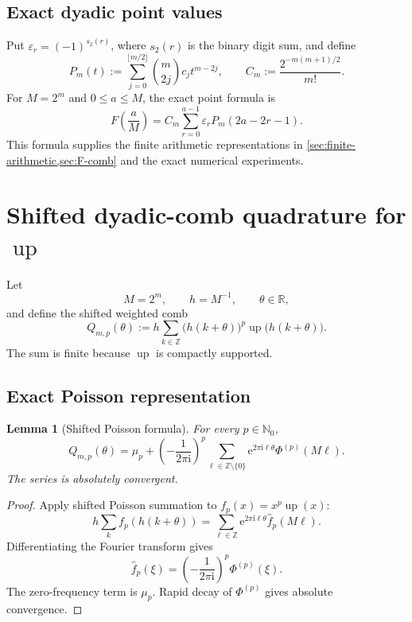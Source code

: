 \documentclass[11pt]{article}
\newtheorem{lemma}[theorem]{Lemma}
\theoremstyle{definition}
\newcommand{\Up}{\operatorname{up}}
\newcommand{\eps}{\varepsilon}
\newcommand{\e}{\mathrm{e}}
\newcommand{\ii}{\mathrm{i}}
\newcommand{\Z}{\mathbb{Z}}
\newcommand{\N}{\mathbb{N}}
\newcommand{\R}{\mathbb{R}}
\begin{document}
\subsection{Exact dyadic point values}

Put $\eps_r=(-1)^{s_2(r)}$, where $s_2(r)$ is the binary digit sum, and define
\begin{equation}
 P_m(t):=\sum_{j=0}^{\lfloor m/2\rfloor}
 \binom m{2j}c_j t^{m-2j},
 \qquad
 C_m:=\frac{2^{-m(m+1)/2}}{m!}.
 \label{eq:Pm-Cm}
\end{equation}
For $M=2^m$ and $0\le a\le M$, the exact point formula is
\begin{equation}
 F\!\left(\frac aM\right)
 =C_m\sum_{r=0}^{a-1}\eps_r P_m(2a-2r-1).
 \label{eq:F-dyadic-point}
\end{equation}
This formula supplies the finite arithmetic representations in
\cref{sec:finite-arithmetic,sec:F-comb} and the exact numerical experiments.

\section{Shifted dyadic-comb quadrature for \texorpdfstring{$\Up$}{up}}
\label{sec:up-comb}

Let
\[
 M=2^m,\qquad h=M^{-1},\qquad \theta\in\R,
\]
and define the shifted weighted comb
\begin{equation}
 Q_{m,p}(\theta)
 :=h\sum_{k\in\Z}\bigl(h(k+\theta)\bigr)^p
 \Up\bigl(h(k+\theta)\bigr).
 \label{eq:Qmp}
\end{equation}
The sum is finite because $\Up$ is compactly supported.

\subsection{Exact Poisson representation}

\begin{lemma}[Shifted Poisson formula]
For every $p\in\N_0$,
\begin{equation}
 Q_{m,p}(\theta)
 =\mu_p+
 \left(-\frac{1}{2\pi\ii}\right)^p
 \sum_{\ell\in\Z\setminus\{0\}}
 \e^{2\pi\ii\ell\theta}\Phi^{(p)}(M\ell).
 \label{eq:Q-Poisson}
\end{equation}
The series is absolutely convergent.
\end{lemma}

\begin{proof}
Apply shifted Poisson summation to $f_p(x)=x^p\Up(x)$:
\[
 h\sum_k f_p(h(k+\theta))
 =\sum_{\ell\in\Z}\e^{2\pi\ii\ell\theta}\widehat f_p(M\ell).
\]
Differentiating the Fourier transform gives
\[
 \widehat f_p(\xi)=\left(-\frac{1}{2\pi\ii}\right)^p\Phi^{(p)}(\xi).
\]
The zero-frequency term is $\mu_p$.  Rapid decay of $\Phi^{(p)}$ gives
absolute convergence.
\end{proof}
\end{document}
